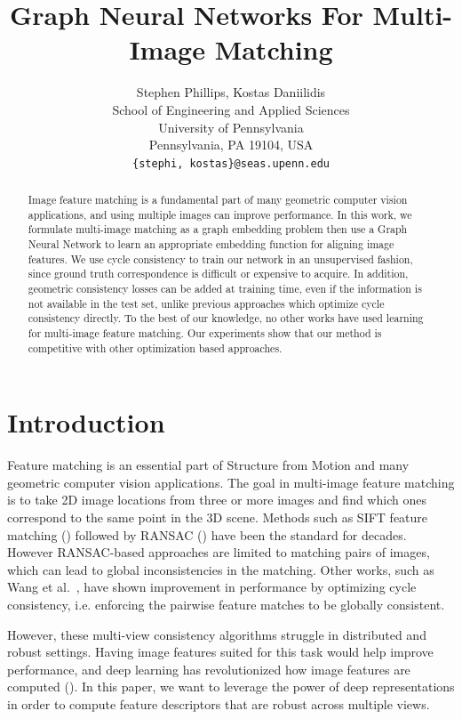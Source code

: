 \documentclass{article} %
\title{Graph Neural Networks For Multi-Image Matching}
\author{Stephen Phillips, Kostas Daniilidis \\
School of Engineering and Applied Sciences \\
University of Pennsylvania \\
Pennsylvania, PA 19104, USA \\
\texttt{\{stephi, kostas\}@seas.upenn.edu} \\
}
\begin{document}
\maketitle

\begin{abstract}
    Image feature matching is a fundamental part of many geometric computer vision applications, and using multiple images can improve performance.
    In this work, we formulate multi-image matching as a graph embedding problem then use a Graph Neural Network to learn an appropriate embedding function for aligning image features.
    We use cycle consistency to train our network in an unsupervised fashion, since ground truth correspondence is difficult or expensive to acquire.
    In addition, geometric consistency losses can be added at training time, even if the information is not available in the test set, unlike previous approaches which optimize cycle consistency directly.
    To the best of our knowledge, no other works have used learning for multi-image feature matching.
    Our experiments show that our method is competitive with other optimization based approaches.
\end{abstract}

\section{Introduction}

Feature matching is an essential part of Structure from Motion and many geometric computer vision applications.
The goal in multi-image feature matching is to take 2D image locations from three or more images and find which ones correspond to the same point in the 3D scene.
Methods such as SIFT feature matching (\cite{lowe2004distinctive}) followed by RANSAC (\cite{fischler1981random}) have been the standard for decades.
However RANSAC-based approaches are limited to matching pairs of images, which can lead to global inconsistencies in the matching.
Other works, such as Wang et al.~\cite{wang2017multi}, have shown improvement in performance by optimizing cycle consistency, i.e. enforcing the pairwise feature matches to be globally consistent.

However, these multi-view consistency algorithms struggle in distributed and robust settings.
Having image features suited for this task would help improve performance, and deep learning has revolutionized how image features are computed (\cite{yi2016lift}).
In this paper, we want to leverage the power of deep representations in order to compute feature descriptors that are robust across multiple views.
\end{document}
